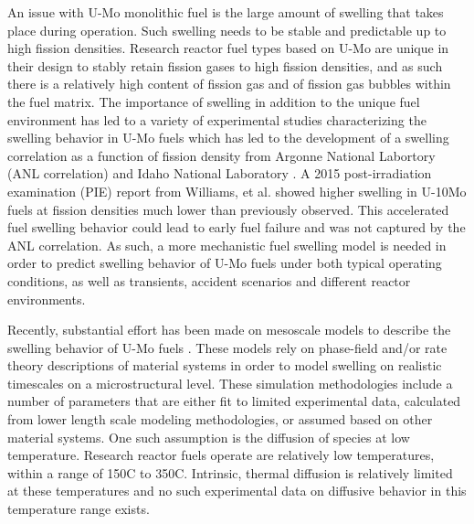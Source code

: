 \documentclass[review]{elsarticle}
\begin{document}
An issue with U-Mo monolithic fuel is the large amount of swelling that takes place during operation\cite{hofman1997}. Such swelling needs to be stable and predictable up to high fission densities. Research reactor fuel types based on U-Mo are unique in their design to stably retain fission gases to high fission densities, and as such there is a relatively high content of fission gas and of fission gas bubbles within the fuel matrix. The importance of swelling in addition to the unique fuel environment has led to a variety of experimental studies characterizing the swelling behavior in U-Mo fuels \cite{rest2009, kim_anl08, meyer2002, kim2013} which has led to the development of a swelling correlation as a function of fission density from Argonne National Labortory (ANL correlation) \cite{kim2011} and Idaho National Laboratory \cite{umo_prelim_report2017}. A 2015 post-irradiation examination (PIE) report \cite{afip6report} from Williams, et al. showed higher swelling in U-10Mo fuels at fission densities much lower than previously observed. This accelerated fuel swelling behavior could lead to early fuel failure and was not captured by the ANL correlation. As such, a more mechanistic fuel swelling model is needed in order to predict swelling behavior of U-Mo fuels under both typical operating conditions, as well as transients, accident scenarios and different reactor environments.

Recently, substantial effort has been made on mesoscale models to describe the swelling behavior of U-Mo fuels \cite{liang2018, liang2018a, liang2017, liang2016, ye2018, hu2017a, hu2016, hu2016a}. These models rely on phase-field and/or rate theory descriptions of material systems in order to model swelling on realistic timescales on a microstructural level. These simulation methodologies include a number of parameters that are either fit to limited experimental data, calculated from lower length scale modeling methodologies, or assumed based on other material systems. One such assumption is the diffusion of species at low temperature. Research reactor fuels operate are relatively low temperatures, within a range of 150\degree C to 350\degree C. Intrinsic, thermal diffusion is relatively limited at these temperatures and no such experimental data on diffusive behavior in this temperature range exists. 
\end{document}
